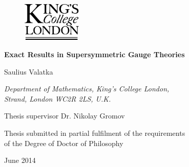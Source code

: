 \documentclass[a4paper]{article}
\numberwithin{equation}{section}
\begin{document}
\begin{titlepage}

\thispagestyle{empty}

\begin{center}

\begin{figure}[t]
	\centering
	\includegraphics[width=0.25\textwidth]{../graphics/kcl_logo}
\end{figure}

\vspace*{50pt}

\LARGE
\textbf{Exact Results in Supersymmetric Gauge Theories}

\vspace{40pt}

\Large
Saulius Valatka

\vspace{30pt}

\small
\it{Department of Mathematics, King's College London, \\
Strand, London WC2R 2LS, U.K.}

\vspace{230pt}

\Large\rm
Thesis supervisor Dr. Nikolay Gromov

\vspace{30pt}

\small
Thesis submitted in partial fulfilment of the requirements \\
of the Degree of Doctor of Philosophy

\vspace{40pt}

\large
June 2014

\end{center}

\end{titlepage}


\pagestyle{fancy}





\newpage 

%


\tableofcontents
\end{document}
